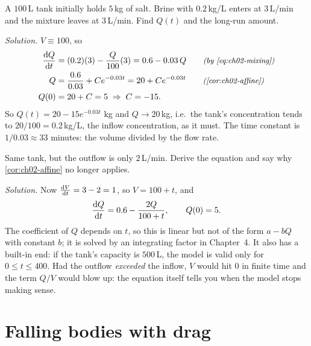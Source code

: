 \begin{example}\label{ex:ch02-mix}
A $100$\,L tank initially holds $5$\,kg of salt. Brine with $0.2$\,kg/L enters
at $3$\,L/min and the mixture leaves at $3$\,L/min. Find $Q(t)$ and the
long-run amount.

\emph{Solution.} $V\equiv 100$, so
\begin{align*}
  \der{Q}{t} &= (0.2)(3) - \frac{Q}{100}(3) = 0.6 - 0.03\,Q \why{by \eqref{eq:ch02-mixing}}\\
  Q &= \frac{0.6}{0.03} + Ce^{-0.03t} = 20 + Ce^{-0.03t} \why{\cref{cor:ch02-affine}}\\
  Q(0) &= 20 + C = 5 \;\Rightarrow\; C = -15 .
\end{align*}
So $Q(t) = 20 - 15e^{-0.03t}$ kg and $Q\to 20$\,kg, i.e.\ the tank's
concentration tends to $20/100 = 0.2$\,kg/L, the inflow concentration, as it
must. The time constant is $1/0.03\approx 33$ minutes: the volume divided by
the flow rate.
\end{example}

\begin{example}\label{ex:ch02-mix-variable}
Same tank, but the outflow is only $2$\,L/min. Derive the equation and say why
\cref{cor:ch02-affine} no longer applies.

\emph{Solution.} Now $\frac{\mathrm{d}V}{\mathrm{d}t} = 3 - 2 = 1$, so $V = 100 + t$, and
\[
  \frac{\mathrm{d}Q}{\mathrm{d}t} = 0.6 - \frac{2Q}{100 + t},\qquad Q(0) = 5 .
\]
The coefficient of $Q$ depends on $t$, so this is linear but not of the form
$a - bQ$ with constant $b$; it is solved by an integrating factor in
Chapter~4. It also has a built-in end: if the tank's capacity is $500$\,L, the
model is valid only for $0\le t\le 400$. Had the outflow \emph{exceeded} the
inflow, $V$ would hit $0$ in finite time and the term $Q/V$ would blow up: the
equation itself tells you when the model stops making sense.
\end{example}

\section{Falling bodies with drag}\label{sec:ch02-drag}


